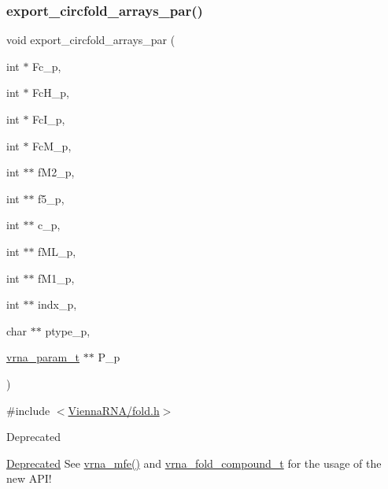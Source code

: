 \subsubsection{\texorpdfstring{export\_circfold\_arrays\_par()}{export\_circfold\_arrays\_par()}}
{\footnotesize\ttfamily void export\+\_\+circfold\+\_\+arrays\+\_\+par (\begin{DoxyParamCaption}\item[{int $\ast$}]{Fc\+\_\+p,  }\item[{int $\ast$}]{Fc\+H\+\_\+p,  }\item[{int $\ast$}]{Fc\+I\+\_\+p,  }\item[{int $\ast$}]{Fc\+M\+\_\+p,  }\item[{int $\ast$$\ast$}]{f\+M2\+\_\+p,  }\item[{int $\ast$$\ast$}]{f5\+\_\+p,  }\item[{int $\ast$$\ast$}]{c\+\_\+p,  }\item[{int $\ast$$\ast$}]{f\+M\+L\+\_\+p,  }\item[{int $\ast$$\ast$}]{f\+M1\+\_\+p,  }\item[{int $\ast$$\ast$}]{indx\+\_\+p,  }\item[{char $\ast$$\ast$}]{ptype\+\_\+p,  }\item[{\mbox{\hyperlink{group__energy__parameters_ga8a69ca7d787e4fd6079914f5343a1f35}{vrna\+\_\+param\+\_\+t}} $\ast$$\ast$}]{P\+\_\+p }\end{DoxyParamCaption})}



{\ttfamily \#include $<$\mbox{\hyperlink{fold_8h}{Vienna\+R\+N\+A/fold.\+h}}$>$}

\begin{DoxyRefDesc}{Deprecated}
\item[\mbox{\hyperlink{deprecated__deprecated000075}{Deprecated}}]See \mbox{\hyperlink{group__mfe__global_gabd3b147371ccf25c577f88bbbaf159fd}{vrna\+\_\+mfe()}} and \mbox{\hyperlink{group__fold__compound_ga1b0cef17fd40466cef5968eaeeff6166}{vrna\+\_\+fold\+\_\+compound\+\_\+t}} for the usage of the new A\+P\+I!\end{DoxyRefDesc}
\mbox{\label{group__mfe__global__deprecated_ga2163034a25c6115d894b199e97e03f6c}} 
